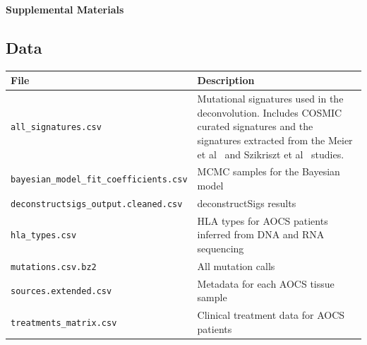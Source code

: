 
\pagebreak
\begin{center}
\textbf{\large Supplemental Materials}
\end{center}

\setcounter{equation}{0}
\setcounter{figure}{0}
\setcounter{table}{0}
\makeatletter
\renewcommand{\theequation}{S\arabic{equation}}
\renewcommand{\thefigure}{S\arabic{figure}}

\subsection*{Data}
\begin{center}
    \begin{tabular}{ | l | p{5cm} |}
    \hline
    File & Description \\ \hline
    \texttt{all_signatures.csv} & Mutational signatures used in the deconvolution. Includes COSMIC curated signatures and the signatures extracted from the Meier et al~\cite{Meier_2014} and Szikriszt et al~\cite{Szikriszt_2016} studies. \\ \hline
    \texttt{bayesian_model_fit_coefficients.csv} & MCMC samples for the Bayesian model \\ \hline
    \texttt{deconstructsigs_output.cleaned.csv} & deconstructSigs results \\ \hline
    \texttt{hla_types.csv} & HLA types for AOCS patients inferred from DNA and RNA sequencing \\ \hline
    \texttt{mutations.csv.bz2} & All mutation calls \\ \hline
    \texttt{sources.extended.csv} & Metadata for each AOCS tissue sample \\ \hline
    \texttt{treatments_matrix.csv} & Clinical treatment data for AOCS patients \\ \hline
    \end{tabular}
\end{center}

